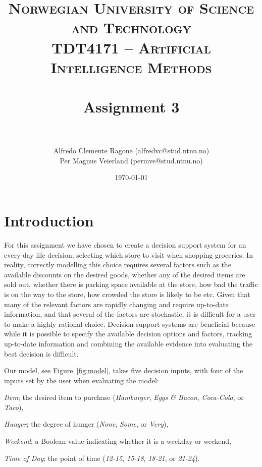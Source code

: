 

\usepackage{float}

\title{	
\normalfont \normalsize 
\textsc{Norwegian University of Science and Technology\\TDT4171 -- Artificial Intelligence Methods} \\ [25pt]
\horrule{0.5pt} \\[0.4cm]
\huge Assignment 3 \\
\horrule{2pt} \\[0.5cm]
}

\author{Alfredo Clemente Ragone (alfredvc@stud.ntnu.no)\\Per Magnus Veierland (permve@stud.ntnu.no)}

\date{\normalsize\today}



\maketitle


\section{Introduction}

For this assignment we have chosen to create a decision support system for an every-day life decision; selecting which store to visit when shopping groceries. In reality, correctly modelling this choice requires several factors such as the available discounts on the desired goods, whether any of the desired items are sold out, whether there is parking space available at the store, how bad the traffic is on the way to the store, how crowded the store is likely to be etc. Given that many of the relevant factors are rapidly changing and require up-to-date information, and that several of the factors are stochastic, it is difficult for a user to make a highly rational choice. Decision support systems are beneficial because while it is possible to specify the available decision options and factors, tracking up-to-date information and combining the available evidence into evaluating the best decision is difficult.

Our model, see Figure~\ref{fig:model}, takes five decision inputs, with four of the inputs set by the user when evaluating the model:
\begin{enumerate*}[label=\arabic*)]
\item \textit{Item}; the desired item to purchase (\textit{Hamburger}, \textit{Eggs \& Bacon}, \textit{Coca-Cola}, or \textit{Taco}),
\item \textit{Hunger}; the degree of hunger (\textit{None}, \textit{Some}, or \textit{Very}),
\item \textit{Weekend}; a Boolean value indicating whether it is a weekday or weekend,
\item \textit{Time of Day}; the point of time (\textit{12-15}, \textit{15-18}, \textit{18-21}, or \textit{21-24}).
\end{enumerate*}

